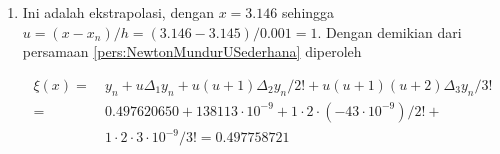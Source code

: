 \begin{enumerate}
	\begin{table}[!htbp]
	\centering
	\begin{tabular}{@{}|c|c|c|c|c|@{}}
	\hline
	$x$ & $y$ & $\Delta_1 y$ & $\Delta_2y$ & $\Delta_3y$\\
	\hline
	$x_0$ & $y_0$ & & &\\
	$x_1$ & $y_1$ & $138245$ & & \\
	$x_2$ & $y_2$ & $138200$ & $-45$& \\
	$x_3$ & $y_3$ & $138156$ & $-44$ & $1$\\
	$x_4$ & $y_4$ & $138113$ & $-43$ & $1$\\
	\hline
	\end{tabular}
	\end{table}

	Dalam hal ini $x = 3.1447$, sehingga $u=(x-x_n)/h=(3.1447-3.145)/0.001=-0.3$. Maka dari persamaan \ref{pers:NewtonMundurUSederhana} kita dapatkan

	\begin{equation*}
	\begin{split}
	\phi(x) =~& y_n + u\Delta_1y_n + u(u+1)\Delta_2y_n/2! + u(u+1)(u+2)\Delta_3y_n/3!\\
	=~& 0.497620650 + (-0.3)(138113\cdot10^{-9})+\\
	&(-0.3)(0.7)(-43\cdot10^{-9})/2! + (-0.3)(0.7)(1.7)(10^{-9})/3!\\
	=~& 0.497579220
	\end{split}
	\end{equation*}

	Kesalahan menurut persamaan \ref{pers:ErrorInterpolasiMundurU} sebanding dengan $\Delta_4 y_n = \Delta_4 y_4 = 0$. Jadi hasil yang didapat teliti hingga $9$ desimal.
\item Ini adalah ekstrapolasi, dengan $x = 3.146$ sehingga $u = (x-x_n)/h = (3.146 - 3.145)/0.001 = 1$. Dengan demikian dari persamaan \ref{pers:NewtonMundurUSederhana} diperoleh

	\begin{equation*}
	\begin{split}
	\xi(x) =~& y_n + u\Delta_1y_n + u(u+1)\Delta_2 y_n/2! + u(u+1)(u+2)\Delta_3 y_n/3!\\
	=~& 0.497620650 + 138113\cdot10^{-9} + 1\cdot2\cdot(-43\cdot10^{-9})/2! +\\
	&1\cdot2\cdot3\cdot10^{-9}/3! = 0.497758721
	\end{split}
	\end{equation*}
\end{enumerate}

